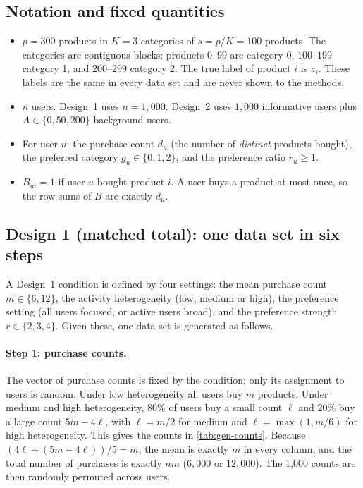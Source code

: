 \documentclass[12pt]{article}
\begin{document}
\subsection{Notation and fixed quantities}

\begin{itemize}
  \item $p=300$ products in $K=3$ categories of $s=p/K=100$ products. The categories are contiguous blocks: products $0$--$99$ are category 0, $100$--$199$ category 1, and $200$--$299$ category 2. The true label of product $i$ is $z_i$. These labels are the same in every data set and are never shown to the methods.
  \item $n$ users. Design~1 uses $n=1{,}000$. Design~2 uses $1{,}000$ informative users plus $A\in\{0,50,200\}$ background users.
  \item For user $u$: the purchase count $d_u$ (the number of \emph{distinct} products bought), the preferred category $g_u\in\{0,1,2\}$, and the preference ratio $r_u\ge 1$.
  \item $B_{ui}=1$ if user $u$ bought product $i$. A user buys a product at most once, so the row sums of $B$ are exactly $d_u$.
\end{itemize}

\subsection{Design 1 (matched total): one data set in six steps}

A Design~1 condition is defined by four settings: the mean purchase count $m\in\{6,12\}$, the activity heterogeneity (low, medium or high), the preference setting (all users focused, or active users broad), and the preference strength $r\in\{2,3,4\}$. Given these, one data set is generated as follows.

\paragraph{Step 1: purchase counts.} The vector of purchase counts is fixed by the condition; only its assignment to users is random. Under low heterogeneity all users buy $m$ products. Under medium and high heterogeneity, 80\% of users buy a small count $\ell$ and 20\% buy a large count $5m-4\ell$, with $\ell=m/2$ for medium and $\ell=\max(1,m/6)$ for high heterogeneity. This gives the counts in \cref{tab:gen-counts}. Because $(4\ell+(5m-4\ell))/5=m$, the mean is exactly $m$ in every column, and the total number of purchases is exactly $nm$ ($6{,}000$ or $12{,}000$). The 1{,}000 counts are then randomly permuted across users.
\end{document}
